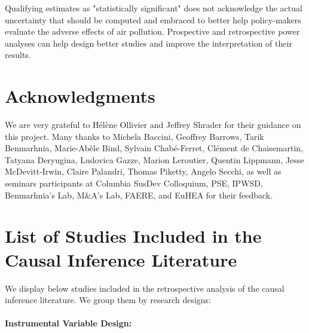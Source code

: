 \documentclass[12pt]{article}
\begin{document}
        Qualifying estimates as "statistically significant" does not acknowledge the actual uncertainty that should be computed and embraced to better help policy-makers evaluate the adverse effects of air pollution. Prospective and retrospective power analyses can help design better studies and improve the interpretation of their results.
        
        
\section*{Acknowledgments}

We are very grateful to Hélène Ollivier and Jeffrey Shrader for their guidance on this project. Many thanks to Michela Baccini, Geoffrey Barrows, Tarik Benmarhnia, Marie-Abèle Bind, Sylvain Chabé-Ferret, Clément de Chaisemartin, Tatyana Deryugina, Ludovica Gazze, Marion Leroutier, Quentin Lippmann, Jesse McDevitt-Irwin, Claire Palandri, Thomas Piketty, Angelo Secchi, as well as seminars participants at Columbia SusDev Colloquium, PSE, IPWSD, Benmarhnia's Lab,  M\&A's Lab, FAERE, and EuHEA for their feedback.


\setlength\bibsep{0pt}



\pagebreak

\appendix

\appendix

\section{List of Studies Included in the Causal Inference Literature} \label{causal_lit}
\setcounter{figure}{0}
\renewcommand\thefigure{\thesection.\arabic{figure}}   


We display below studies included in the retrospective analysis of the causal inference literature. We group them by research designs:

\paragraph{Instrumental Variable Design:} \cite{moretti_pollution_2011, ebenstein_particulate_2015, schwartz_estimating_2015, arceo_does_2016, he_effect_2016, knittel_caution_2016, schlenker_airports_2016, sheldon_impact_2017, schwartz_estimating_2017, zhong_traffic_2017, barwick_morbidity_2018, hanlon2018london, schwartz_national_2018, halliday_vog_2019, deryugina_mortality_2019, cheung_mitigating_2020, fan_impact_2020, he_straw_2020, giaccherini_when_2021, godzinski_disentangling_2021, guidetti_placebo_2021, kim_air_2021, liu_effect_2021, xia_short-term_2022}
\end{document}
